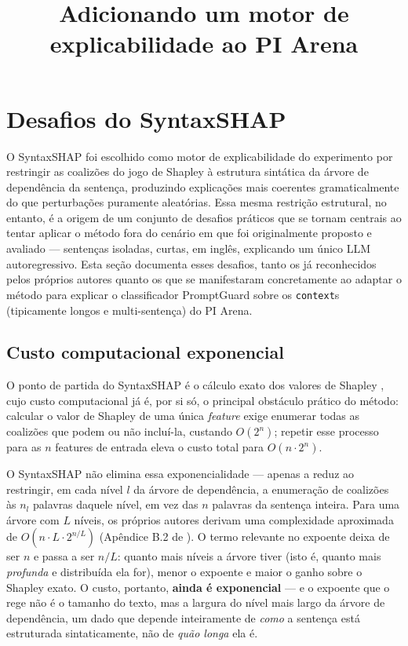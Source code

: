 \documentclass{article}
\title{Adicionando um motor de explicabilidade ao PI Arena}
\author{}
\date{}
\begin{document}
\maketitle

\section{Desafios do SyntaxSHAP}
\label{sec:desafios-syntaxshap}

O SyntaxSHAP \parencite{amara2024syntaxshap} foi escolhido como motor de explicabilidade do experimento por restringir as coalizões do jogo de Shapley à estrutura sintática da árvore de dependência da sentença, produzindo explicações mais coerentes gramaticalmente do que perturbações puramente aleatórias. Essa mesma restrição estrutural, no entanto, é a origem de um conjunto de desafios práticos que se tornam centrais ao tentar aplicar o método fora do cenário em que foi originalmente proposto e avaliado — sentenças isoladas, curtas, em inglês, explicando um único LLM autoregressivo. Esta seção documenta esses desafios, tanto os já reconhecidos pelos próprios autores quanto os que se manifestaram concretamente ao adaptar o método para explicar o classificador PromptGuard sobre os \texttt{context}s (tipicamente longos e multi-sentença) do PI Arena.

\subsection{Custo computacional exponencial}
\label{sec:custo-exponencial}

O ponto de partida do SyntaxSHAP é o cálculo exato dos valores de Shapley \parencite{shapley1953value}, cujo custo computacional já é, por si só, o principal obstáculo prático do método: calcular o valor de Shapley de uma única \textit{feature} exige enumerar todas as coalizões que podem ou não incluí-la, custando $O(2^n)$; repetir esse processo para as $n$ features de entrada eleva o custo total para $O(n \cdot 2^n)$.

O SyntaxSHAP não elimina essa exponencialidade — apenas a reduz ao restringir, em cada nível $l$ da árvore de dependência, a enumeração de coalizões às $n_l$ palavras daquele nível, em vez das $n$ palavras da sentença inteira. Para uma árvore com $L$ níveis, os próprios autores derivam uma complexidade aproximada de $O(n \cdot L \cdot 2^{n/L})$ (Apêndice B.2 de \cite{amara2024syntaxshap}). O termo relevante no expoente deixa de ser $n$ e passa a ser $n/L$: quanto mais níveis a árvore tiver (isto é, quanto mais \textit{profunda} e distribuída ela for), menor o expoente e maior o ganho sobre o Shapley exato. O custo, portanto, \textbf{ainda é exponencial} — e o expoente que o rege não é o tamanho do texto, mas a largura do nível mais largo da árvore de dependência, um dado que depende inteiramente de \emph{como} a sentença está estruturada sintaticamente, não de \emph{quão longa} ela é.
\end{document}
